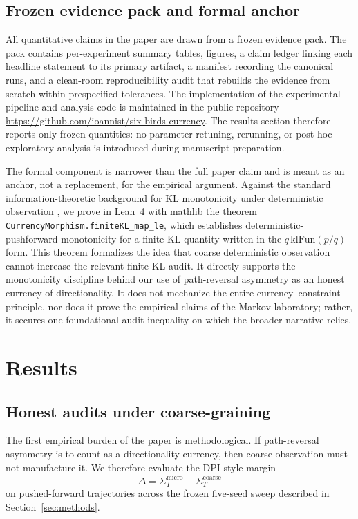 \documentclass[11pt,a4paper]{article}
\newcommand{\SigmaT}{\Sigma_T}
\begin{document}
\subsection{Frozen evidence pack and formal anchor}

All quantitative claims in the paper are drawn from a frozen evidence pack. The pack contains per-experiment summary tables, figures, a claim ledger linking each headline statement to its primary artifact, a manifest recording the canonical runs, and a clean-room reproducibility audit that rebuilds the evidence from scratch within prespecified tolerances. The implementation of the experimental pipeline and analysis code is maintained in the public repository \url{https://github.com/ioannist/six-birds-currency}. The results section therefore reports only frozen quantities: no parameter retuning, rerunning, or post hoc exploratory analysis is introduced during manuscript preparation.

The formal component is narrower than the full paper claim and is meant as an anchor, not a replacement, for the empirical argument. Against the standard information-theoretic background for KL monotonicity under deterministic observation \cite{coverthomas2006}, we prove in Lean~4 with mathlib \cite{demoura2015lean,mathlib2020} the theorem \texttt{CurrencyMorphism.finiteKL\_map\_le}, which establishes deterministic-pushforward monotonicity for a finite KL quantity written in the \(q\,\mathrm{klFun}(p/q)\) form. This theorem formalizes the idea that coarse deterministic observation cannot increase the relevant finite KL audit. It directly supports the monotonicity discipline behind our use of path-reversal asymmetry as an honest currency of directionality. It does not mechanize the entire currency--constraint principle, nor does it prove the empirical claims of the Markov laboratory; rather, it secures one foundational audit inequality on which the broader narrative relies.
 \section{Results}\label{sec:results}

\subsection{Honest audits under coarse-graining}

The first empirical burden of the paper is methodological. If path-reversal asymmetry is to count as a directionality currency, then coarse observation must not manufacture it. We therefore evaluate the DPI-style margin
\[
\Delta=\SigmaT^{\mathrm{micro}}-\SigmaT^{\mathrm{coarse}}
\]
on pushed-forward trajectories across the frozen five-seed sweep described in Section~\ref{sec:methods}.
\end{document}
